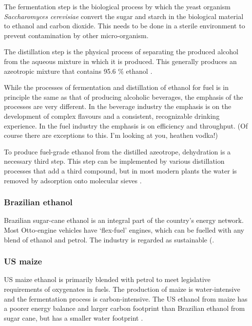 The fermentation step is the biological process by which the yeast organism
\textit{Saccharomyces cerevisiae} convert the sugar and starch in the biological
material to ethanol and carbon dioxide. This needs to be done in a sterile
environment to prevent contamination by other micro-organism.

The distillation step is the physical process of separating the produced alcohol
from the aqueous mixture in which it is produced. This generally produces an
azeotropic mixture that contains 95.6 \% ethanol \autocite{Kumar2010}.

While the processes of fermentation and distillation of ethanol for fuel is in
principle the same as that of producing alcoholic beverages, the emphasis of the
processes are very different. In the beverage industry the emphasis is on the
development of complex flavours and a consistent, recognizable drinking 
experience. In the fuel industry the emphasis is on efficiency and throughput.
(Of course there are exceptions to this. I'm looking at you, heathen vodka!)

To produce fuel-grade ethanol from the distilled azeotrope, dehydration is a
necessary third step. This step can be implemented by various distillation
processes that add a third compound, but in most modern plants the water is
removed by adsorption onto molecular sieves \autocite{Kumar2010}.

\subsubsection{Brazilian ethanol}

Brazilian sugar-cane ethanol is an integral part of the country's energy
network. Most Otto-engine vehicles have `flex-fuel' engines, which can be
fuelled with any blend of ethanol and petrol. The industry is regarded as
sustainable (\autocite{Smeets2006}.

\subsubsection{US maize}

US maize ethanol is primarily blended with petrol to meet legislative
requirements of oxygenates in fuels. The production of maize is water-intensive
and the fermentation process is carbon-intensive. The US ethanol from maize has
a poorer energy balance and larger carbon footprint than Brazilian ethanol from
sugar cane, but has a smaller water footprint \autocite{Mekonnen2018}.

